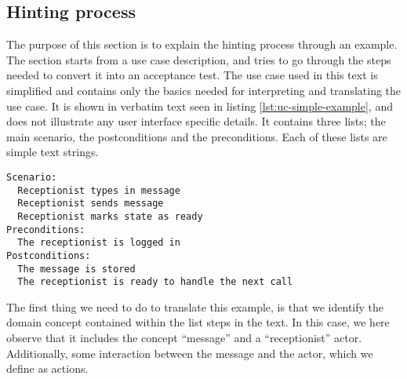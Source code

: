 \subsection{Hinting process}
The purpose of this section is to explain the hinting process through an example. The section starts from a use case description, and tries to go through the steps needed to convert it into an acceptance test. The use case used in this text is simplified and contains only the basics needed for interpreting and translating the use case. It is shown in verbatim text seen in listing \ref{lst:uc-simple-example}, and does not illustrate any user interface specific details. It contains three lists; the main scenario, the postconditions and the preconditions. Each of these lists are simple text strings.

\begin{lstlisting}[frame=single,style=usecase, caption=Use case example, label=lst:uc-simple-example]
Scenario:
  Receptionist types in message
  Receptionist sends message
  Receptionist marks state as ready 
Preconditions:
  The receptionist is logged in
Postconditions:
  The message is stored
  The receptionist is ready to handle the next call
\end{lstlisting}
The first thing we need to do to translate this example, is that we identify the domain concept contained within the list steps in the text. In this case, we here observe that it includes the concept ``message'' and a ``receptionist'' actor. Additionally, some interaction between the message and the actor, which we define as actions.\medskip

